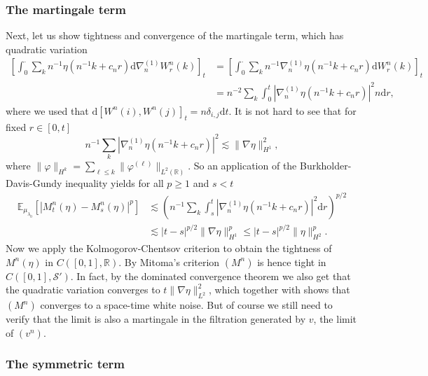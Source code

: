 \documentclass[11pt, a4paper]{article}
\newcommand{\mathd}{\mathrm{d}}
\newcommand{\CS}{\mathscr{S}}
\newcommand{\R}{\mathbb{R}}
\newcommand{\1}{\mathbf{1}}
\begin{document}
\subsubsection{The martingale term}\label{sec:martingale}

Next, let us show tightness and convergence of the martingale term, which has
quadratic variation
\begin{align*}
 \left[ \int_0^{\cdot} \sum_k n^{- 1} \eta (n^{- 1} k + c_n r) \mathd
 \nabla^{(1)}_n W^n_r (k) \right]_t
 &= \left[ \int_0^{\cdot} \sum_k n^{- 1}
 \nabla^{(1)}_n \eta (n^{- 1} k + c_n r) \mathd W^n_r (k) \right]_t \\
 &= n^{- 2} \sum_k \int_0^t | \nabla^{(1)}_n \eta (n^{- 1} k + c_n r) |^2 n \mathd r,
\end{align*}
where we used that $\mathd [W^n (i), W^n (j)]_t = n \delta_{i, j} \mathd t$. It is not hard to see that for fixed $r \in [0, t]$
\[ n^{- 1} \sum_k | \nabla^{(1)}_n \eta (n^{- 1} k + c_n r) |^2 \lesssim \|
   \nabla \eta \|_{H^1}^2, \]
where
$\| \varphi \|_{H^k} = \sum_{\ell \leqslant k} \| \varphi^{(\ell)} \|_{L^2
   (\mathbb{R})}$.
So an application of the Burkholder-Davis-Gundy inequality yields for all $p
\geqslant 1$ and $s < t$
\begin{align*}
 \mathbb{E}_{{\mu}_{\lambda_0}} [| M^n_t (\eta) - M^n_s (\eta) |^p]
 &\lesssim \left( n^{- 1} \sum_k \int_s^t | \nabla^{(1)}_n \eta (n^{- 1} k +
 c_n r) |^2 \mathd r \right)^{p / 2} \\
 &\lesssim | t - s |^{p / 2} \| \nabla \eta \|_{H^1}^p \leqslant | t - s |^{p
 / 2} \| \eta \|_{H^2}^p .
\end{align*}
Now we apply the Kolmogorov-Chentsov criterion 
\cite{bib:kolmogorovCentsov} to obtain the tightness of $M^n(\eta)$ in $C\left( [0,1], \R \right)$.
%
By Mitoma's criterion \cite{bib:mitoma} $(M^n)$ is hence tight
in $C \left( [0, 1], \CS' \right)$.
%
In fact, by the dominated convergence
theorem we also get that the quadratic variation converges to $t \| \nabla
\eta \|^2_{L^2}$, which together with \cite[Proposition 5.1]{bib:aldous}
shows that $(M^n)$ converges to a space-time white noise. But of course we
still need to verify that the limit is also a martingale in the filtration
generated by $v$, the limit of $(v^n)$.


\subsubsection{The symmetric term}\label{sec:symmetric}
\end{document}

